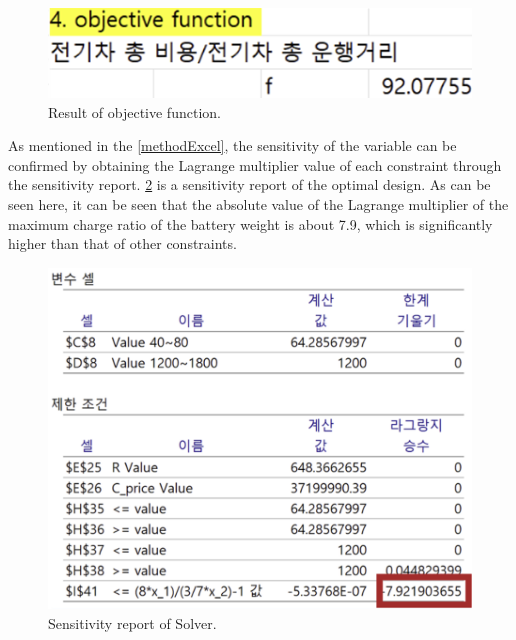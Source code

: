 \documentclass[11pt,twocolumn]{article}
\begin{document}
            \begin{figure}[h]
                    \centering
                    \includegraphics[width=.8\columnwidth]{Excel6.png}
                    \caption{Result of objective function.}
                    \label{res2}
            \end{figure}

            \par
            As mentioned in the \cref{methodExcel}, the sensitivity of the variable can be confirmed by obtaining the Lagrange multiplier value of each constraint through the sensitivity report.
            \cref{sense1} is a sensitivity report of the optimal design.
            As can be seen here, it can be seen that the absolute value of the Lagrange multiplier of the maximum charge ratio of the battery weight is about 7.9, which is significantly higher than that of other constraints.
            
            \begin{figure}[h]
                \centering
                    \centering
                    \includegraphics[width=.8\columnwidth]{Excel77.png}
                    \caption{Sensitivity report of Solver.}
                    \label{sense1}
            \end{figure}
\end{document}
